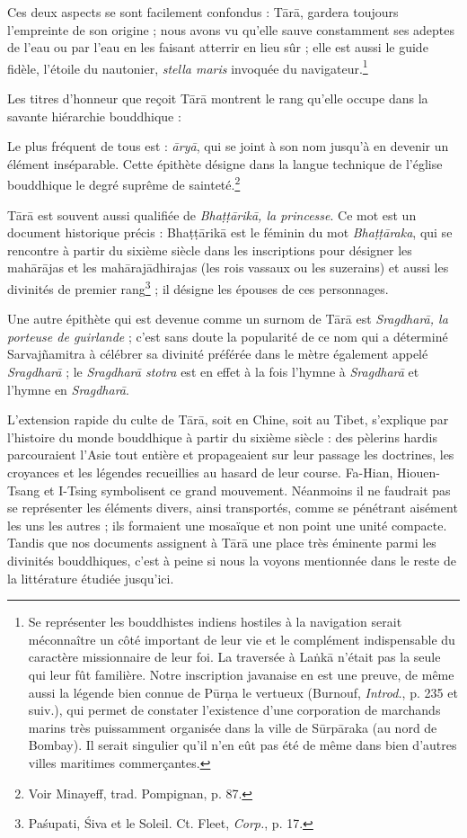\documentclass[a4paper, 11pt, oneside, french, landscape, twocolumn]{article}
\begin{document}
Ces deux aspects se sont facilement confondus : T\={a}r\={a}, gardera toujours l'empreinte de son origine ; nous avons vu qu'elle sauve constamment ses adeptes de l'eau ou par l'eau en les faisant atterrir en lieu sûr ; elle est aussi le guide fidèle, l'étoile du nautonier, \emph{stella maris} invoquée du navigateur.\footnote{Se représenter les bouddhistes indiens hostiles à la navigation serait méconnaître un côté important de leur vie et le complément indispensable du caractère missionnaire de leur foi. La traversée à La\.{n}k\={a} n'était pas la seule qui leur fût familière. Notre inscription javanaise en est une preuve, de même aussi la légende bien connue de P\={u}r\d{n}a le vertueux (Burnouf, \emph{Introd.}, p. 235 et suiv.), qui permet de constater l'existence d'une corporation de marchands marins très puissamment organisée dans la ville de S\={u}rp\={a}raka (au nord de Bombay). Il serait singulier qu'il n'en eût pas été de même dans bien d'autres villes maritimes commerçantes.}

Les titres d'honneur que reçoit T\={a}r\={a} montrent le rang qu'elle occupe dans la savante hiérarchie bouddhique :

Le plus fréquent de tous est : \emph{\={a}ry\={a}}, qui se joint à son nom jusqu'à en devenir un élément inséparable. Cette épithète désigne dans la langue technique de l'église bouddhique le degré suprême de sainteté.\footnote{Voir Minayeff, trad. Pompignan, p. 87.}

T\={a}r\={a} est souvent aussi qualifiée de \emph{Bha\d{t}\d{t}\={a}rik\={a}, la princesse}. Ce mot est un document historique précis : Bha\d{t}\d{t}\={a}rik\={a} est le féminin du mot \emph{Bha\d{t}\d{t}\={a}raka}, qui se rencontre à partir du sixième siècle dans les inscriptions pour désigner les mah\={a}r\={a}jas et les mah\={a}raj\={a}dhirajas (les rois vassaux ou les suzerains) et aussi les divinités de premier rang\footnote{Pa\'{s}upati, \'{S}iva et le Soleil. Ct. Fleet, \emph{Corp.}, p. 17.} ; il désigne les épouses de ces personnages.

Une autre épithète qui est devenue comme un surnom de T\={a}r\={a} est \emph{Sragdhar\={a}, la porteuse de guirlande} ; c'est sans doute la popularité de ce nom qui a déterminé Sarvaj\~{n}amitra à célébrer sa divinité préférée dans le mètre également appelé \emph{Sragdhar\={a}} ; le \emph{Sragdhar\={a} stotra} est en effet à la fois l'hymne à \emph{Sragdhar\={a}} et l'hymne en \emph{Sragdhar\={a}}.

L'extension rapide du culte de T\={a}r\={a}, soit en Chine, soit au Tibet, s'explique par l'histoire du monde bouddhique à partir du sixième siècle : des pèlerins hardis parcouraient l'Asie tout entière et propageaient sur leur passage les doctrines, les croyances et les légendes recueillies au hasard de leur course. Fa-Hian, Hiouen-Tsang et I-Tsing symbolisent ce grand mouvement. Néanmoins il ne faudrait pas se représenter les éléments divers, ainsi transportés, comme se pénétrant aisément les uns les autres ; ils formaient une mosaïque et non point une unité compacte. Tandis que nos documents assignent à T\={a}r\={a} une place très éminente parmi les divinités bouddhiques, c'est à peine si nous la voyons mentionnée dans le reste de la littérature étudiée jusqu'ici.
\end{document}
